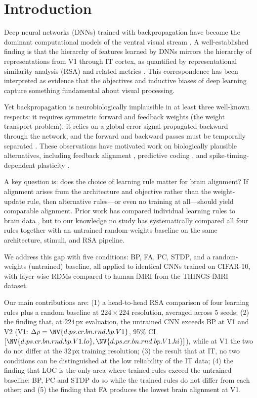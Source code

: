 \documentclass[10pt,twocolumn]{article}
\newcommand{\dps}[3]{\NV{d.ps.cr.bn.#1.#2.#3}}
\newcommand{\dpsci}[3]{[\NV{d.ps.cr.bn.#1.#2.#3.lo},\NV{d.ps.cr.bn.#1.#2.#3.hi}]}
\begin{document}
\bigskip

\section{Introduction}

Deep neural networks (DNNs) trained with backpropagation have become the dominant computational models of the ventral visual stream \citep{yamins2016}. A well-established finding is that the hierarchy of features learned by DNNs mirrors the hierarchy of representations from V1 through IT cortex, as quantified by representational similarity analysis (RSA) and related metrics \citep{kriegeskorte2008, schrimpf2020}. This correspondence has been interpreted as evidence that the objectives and inductive biases of deep learning capture something fundamental about visual processing.

Yet backpropagation is neurobiologically implausible in at least three well-known respects: it requires symmetric forward and feedback weights (the weight transport problem), it relies on a global error signal propagated backward through the network, and the forward and backward passes must be temporally separated \citep{crick1989, lillicrap2020}. These observations have motivated work on biologically plausible alternatives, including feedback alignment \citep{lillicrap2016}, predictive coding \citep{rao1999, whittington2017}, and spike-timing-dependent plasticity \citep{bi1998}.

A key question is: does the choice of learning rule matter for brain alignment? If alignment arises from the architecture and objective rather than the weight-update rule, then alternative rules---or even no training at all---should yield comparable alignment. Prior work has compared individual learning rules to brain data \citep{schrimpf2020}, but to our knowledge no study has systematically compared all four rules together with an untrained random-weights baseline on the same architecture, stimuli, and RSA pipeline.

We address this gap with five conditions: BP, FA, PC, STDP, and a random-weights (untrained) baseline, all applied to identical CNNs trained on CIFAR-10, with layer-wise RDMs compared to human fMRI from the THINGS-fMRI dataset.

Our main contributions are: (1) a head-to-head RSA comparison of four learning rules plus a random baseline at $224\times224$ resolution, averaged across 5 seeds; (2) the finding that, at $224$\,px evaluation, the untrained CNN exceeds BP at V1 and V2 (V1: $\Delta\rho = \dps{rnd}{bp}{V1}$, 95\% CI $\dpsci{rnd}{bp}{V1}$), while at V1 the two do not differ at the $32$\,px training resolution; (3) the result that at IT, no two conditions can be distinguished at the low reliability of the IT data; (4) the finding that LOC is the only area where trained rules exceed the untrained baseline: BP, PC and STDP do so while the trained rules do not differ from each other; and (5) the finding that FA produces the lowest brain alignment at V1.
\end{document}
